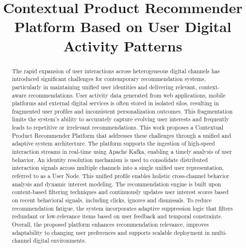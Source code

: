\documentclass[conference]{IEEEtran}
\begin{document}
\title{Contextual Product Recommender Platform Based on User Digital Activity Patterns}

\author{
\and
{}
}

\maketitle

\begin{abstract}
The rapid expansion of user interactions across heterogeneous digital channels has introduced significant challenges for contemporary recommendation systems, particularly in maintaining unified user identities and delivering relevant, context-aware recommendations. User activity data generated from web applications, mobile platforms and external digital services is often stored in isolated silos, resulting in fragmented user profiles and inconsistent personalization outcomes. This fragmentation limits the system's ability to accurately capture evolving user interests and frequently leads to repetitive or irrelevant recommendations. This work proposes a Contextual Product Recommender Platform that addresses these challenges through a unified and adaptive system architecture. The platform supports the ingestion of high-speed interaction streams in real-time using Apache Kafka, enabling a timely analysis of user behavior. An identity resolution mechanism is used to consolidate distributed interaction signals across multiple channels into a single unified user representation, referred to as a User Node. This unified profile enables holistic cross-channel behavior analysis and dynamic interest modeling. The recommendation engine is built upon content-based filtering techniques and continuously updates user interest scores based on recent behavioral signals, including clicks, ignores and dismissals. To reduce recommendation fatigue, the system incorporates adaptive suppression logic that filters redundant or low-relevance items based on user feedback and temporal constraints. Overall, the proposed platform enhances recommendation relevance, improves adaptability to changing user preferences and supports scalable deployment in multi-channel digital environments.
\end{abstract}
\end{document}
